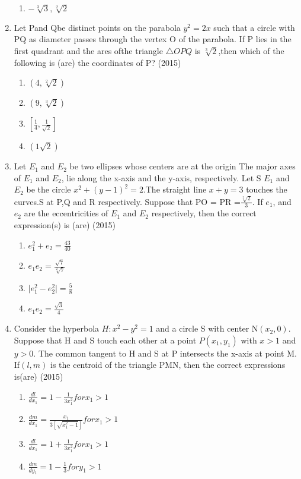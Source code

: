 \documentclass[12pt]{article}
\providecommand{\sbrak}[1]{\ensuremath{{}\left[#1\right]}}
\begin{document}
\begin{enumerate}
\begin{enumerate}
\item $-\sqrt[3]{3},\sqrt[2]{2}$
\end{enumerate}
\item Let Pand Qbe distinct points on the parabola $y^2=2x$ such that a circle with PQ as diameter passes through the vertex O of the parabola. If P lies in the first quadrant and the ares ofthe triangle $\triangle OPQ$ is $\sqrt[3]{2}$,then which of the following is (are) the coordinates of P? (2015)
\begin{enumerate}
\item $(4,\sqrt[2]{2})$
\item $(9,\sqrt[3]{2})$
\item $\sbrak{\frac{1}{4},\frac{1}{\sqrt{2}}}$
\item $(1\sqrt{2})$
\end{enumerate}
\item Let $E_1$ and $E_2$  be two ellipses whose centers are at the origin The major axes of $E_1$ and $E_2$, lie along the x-axis and the y-axis, respectively. Let S $E_1$ and $E_2$  be the circle $x^2+(y-1)^2=2$.The straight line $x+y=3$ touches the curves.S at P,Q and R respectively. Suppose that PO = PR =$\frac{\sqrt[2]{2}}{3}$. If $e_1$, and $e_2$ are the eccentricities of $E_1$ and $E_2$ respectively, then the correct expression(s) is (are) (2015)
\begin{enumerate}
\item $e_1^2+e_2=\frac{43}{40}$
\item $e_1e_2=\frac{\sqrt{7}}{\sqrt[2]{7}}$
\item $\mid e_1^2-e_2^2\mid =\frac{5}{8}$
\item $e_1e_2=\frac{\sqrt{3}}{4}$
\end{enumerate}
\item Consider the hyperbola $H:x^2-y^2=1$ and a circle S with center N$(x_2,0)$. Suppose that H and S touch each other at a point $P(x_1,y_1)$ with $x >1$ and $y>0$. The common tangent to H and S at P intersects the x-axis at point M. If$(l,m)$ is the centroid of the triangle PMN, then the correct expressions is(are) (2015)
\begin{enumerate}
\item $\frac{dl}{dx_1}=1-\frac{1}{3x_1^2}forx_1>1$
\item $\frac{dm}{dx_1}=\frac{x_1}{3\sbrak{\sqrt{x_1^2-1}}}forx_1>1$
\item $\frac{dl}{dx_1}=1+\frac{1}{3x_1^2}forx_1>1$
\item $\frac{dm}{dy_1}=1-\frac{1}{3}fory_1>1$
\end{enumerate}

\end{enumerate}
\end{document}
